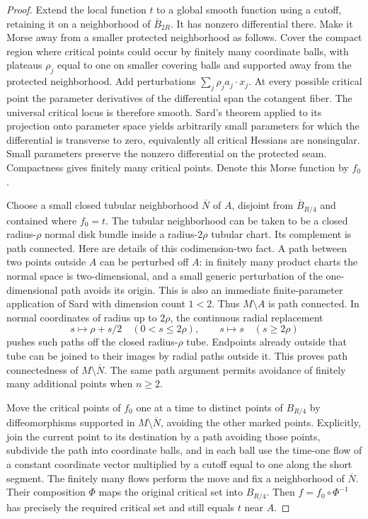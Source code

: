 \documentclass[11pt]{article}
\theoremstyle{remark}
\begin{document}
\begin{proof}
Extend the local function $t$ to a global smooth function using a cutoff, retaining it on a neighborhood of $\overline B_{2R}$. It has nonzero differential there. Make it Morse away from a smaller protected neighborhood as follows. Cover the compact region where critical points could occur by finitely many coordinate balls, with plateaus $\rho_j$ equal to one on smaller covering balls and supported away from the protected neighborhood. Add perturbations $\sum_j\rho_j a_j\cdot x_j$. At every possible critical point the parameter derivatives of the differential span the cotangent fiber. The universal critical locus is therefore smooth. Sard's theorem applied to its projection onto parameter space yields arbitrarily small parameters for which the differential is transverse to zero, equivalently all critical Hessians are nonsingular. Small parameters preserve the nonzero differential on the protected seam. Compactness gives finitely many critical points. Denote this Morse function by $f_0$.

Choose a small closed tubular neighborhood $\overline N$ of $A$, disjoint from $\overline B_{R/4}$ and contained where $f_0=t$. The tubular neighborhood can be taken to be a closed radius-$\rho$ normal disk bundle inside a radius-$2\rho$ tubular chart. Its complement is path connected. Here are details of this codimension-two fact. A path between two points outside $A$ can be perturbed off $A$: in finitely many product charts the normal space is two-dimensional, and a small generic perturbation of the one-dimensional path avoids its origin. This is also an immediate finite-parameter application of Sard with dimension count $1<2$. Thus $M\setminus A$ is path connected. In normal coordinates of radius up to $2\rho$, the continuous radial replacement
$$
 s\longmapsto\rho+s/2\quad(0<s\le2\rho),
 \qquad s\longmapsto s\quad(s\ge2\rho)
$$
pushes such paths off the closed radius-$\rho$ tube. Endpoints already outside that tube can be joined to their images by radial paths outside it. This proves path connectedness of $M\setminus\overline N$. The same path argument permits avoidance of finitely many additional points when $n\ge2$.

Move the critical points of $f_0$ one at a time to distinct points of $B_{R/4}$ by diffeomorphisms supported in $M\setminus\overline N$, avoiding the other marked points. Explicitly, join the current point to its destination by a path avoiding those points, subdivide the path into coordinate balls, and in each ball use the time-one flow of a constant coordinate vector multiplied by a cutoff equal to one along the short segment. The finitely many flows perform the move and fix a neighborhood of $\overline N$. Their composition $\Phi$ maps the original critical set into $B_{R/4}$. Then $f=f_0\circ\Phi^{-1}$ has precisely the required critical set and still equals $t$ near $A$.
\end{proof}
\end{document}

